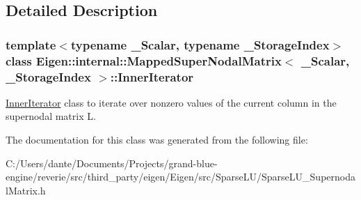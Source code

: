 \subsection{Detailed Description}
\subsubsection*{template$<$typename \+\_\+\+Scalar, typename \+\_\+\+Storage\+Index$>$\newline
class Eigen\+::internal\+::\+Mapped\+Super\+Nodal\+Matrix$<$ \+\_\+\+Scalar, \+\_\+\+Storage\+Index $>$\+::\+Inner\+Iterator}

\mbox{\hyperlink{class_eigen_1_1internal_1_1_mapped_super_nodal_matrix_1_1_inner_iterator}{Inner\+Iterator}} class to iterate over nonzero values of the current column in the supernodal matrix L. 



The documentation for this class was generated from the following file\+:\begin{DoxyCompactItemize}
\item 
C\+:/\+Users/dante/\+Documents/\+Projects/grand-\/blue-\/engine/reverie/src/third\+\_\+party/eigen/\+Eigen/src/\+Sparse\+L\+U/Sparse\+L\+U\+\_\+\+Supernodal\+Matrix.\+h\end{DoxyCompactItemize}
